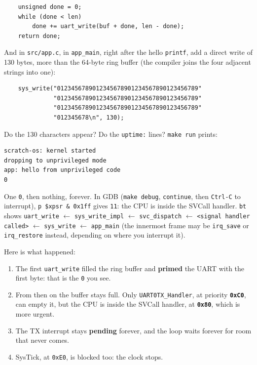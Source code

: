 \begin{lstlisting}
    unsigned done = 0;
    while (done < len)
        done += uart_write(buf + done, len - done);
    return done;
\end{lstlisting}

And in \texttt{src/app.c}, in \texttt{app\_main}, right after the hello \texttt{printf}, add a direct write of 130 bytes, more than the 64-byte ring buffer (the compiler joins the four adjacent strings into one):

\begin{lstlisting}
    sys_write("0123456789012345678901234567890123456789"
              "0123456789012345678901234567890123456789"
              "0123456789012345678901234567890123456789"
              "012345678\n", 130);
\end{lstlisting}

Do the 130 characters appear? Do the \texttt{uptime:} lines? \texttt{make run} prints:

\begin{lstlisting}[language=bash]
scratch-os: kernel started
dropping to unprivileged mode
app: hello from unprivileged code
0
\end{lstlisting}

One \texttt{0}, then nothing, forever. In GDB (\texttt{make debug}, \texttt{continue}, then \texttt{Ctrl-C} to interrupt), \texttt{p \$xpsr \& 0x1ff} gives \texttt{11}: the CPU is inside the SVCall handler. \texttt{bt} shows \texttt{uart\_write} $\leftarrow$ \texttt{sys\_write\_impl} $\leftarrow$ \texttt{svc\_dispatch} $\leftarrow$ \texttt{<signal handler called>} $\leftarrow$ \texttt{sys\_write} $\leftarrow$ \texttt{app\_main} (the innermost frame may be \texttt{irq\_save} or \texttt{irq\_restore} instead, depending on where you interrupt it).

Here is what happened:
\begin{enumerate}
    \item The first \texttt{uart\_write} filled the ring buffer and \textbf{primed} the UART with the first byte: that is the \texttt{0} you see.
    \item From then on the buffer stays full. Only \texttt{UART0TX\_Handler}, at priority \textbf{\texttt{0xC0}}, can empty it, but the CPU is inside the SVCall handler, at \textbf{\texttt{0x80}}, which is more urgent.
    \item The TX interrupt stays \textbf{pending} forever, and the loop waits forever for room that never comes.
    \item SysTick, at \texttt{0xE0}, is blocked too: the clock stops.
\end{enumerate}

